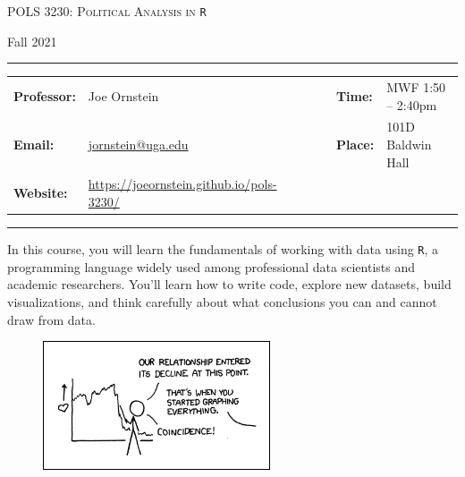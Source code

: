 \documentclass[11pt, letterpaper]{article}
\begin{document}
\begin{center}
{\Large \textsc{POLS 3230: Political Analysis in \texttt{R}}}
\end{center}
\begin{center}
{\large Fall 2021}
\end{center}

\begin{center}
\rule{6.5in}{0.4pt}
\begin{minipage}[t]{.96\textwidth}
\begin{tabular}{llcccll}
\textbf{Professor:} & Joe Ornstein & & &  & \textbf{Time:} & MWF 1:50 -- 2:40pm \\
\textbf{Email:} &  \href{mailto:jornstein@uga.edu}{jornstein@uga.edu} & & & & \textbf{Place:} & 101D Baldwin Hall\\
\textbf{Website:} & \href{https://joeornstein.github.io/pols-3230/}{https://joeornstein.github.io/pols-3230/} & & & & &
\end{tabular}
\end{minipage}
\rule{6.5in}{0.4pt}
\end{center}
\vspace{.15cm}
\setlength{\unitlength}{1in}
\renewcommand{\arraystretch}{2}

\noindent In this course, you will learn the fundamentals of working with data using \texttt{R}, a programming language widely used among professional data scientists and academic researchers. You'll learn how to write code, explore new datasets, build visualizations, and think carefully about what conclusions you can and cannot draw from data.

\begin{figure}[h]
	\centering
	\href{https://xkcd.com/523/}{\includegraphics[width=0.6\textwidth]{img/decline.png}}
\end{figure}

\end{document}
